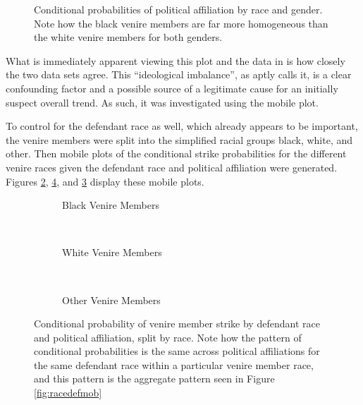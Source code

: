 \begin{figure}[h!]
  \centering
  \caption[Political Affiliation by Race and Gender (Sunshine)]
  {\footnotesize Conditional probabilities of political affiliation by race and gender. Note how the black venire members are far more
    homogeneous than the white venire members for both genders.} 
  \label{fig:racepolit}
\end{figure}

What is immediately apparent viewing this plot and the data in \cite{revesz2016} is how closely the two data sets agree. This
``ideological imbalance'', as \citeauthor{revesz2016} aptly calls it, is a clear confounding factor and a possible source of a
legitimate cause for an initially suspect overall trend. As such, it was investigated using the mobile plot.

To control for the defendant race as well, which already appears to be important, the venire members were split into the
simplified racial groups black, white, and other. Then mobile plots of the conditional strike probabilities for the different
venire races given the defendant race and political affiliation were generated. Figures \ref{fig:blackdefpol},
\ref{fig:otherdefpol}, and \ref{fig:whitedefpol} display these mobile plots.

\begin{figure}[h!]
  \centering
  \begin{subfigure}{0.40\textwidth}
    \caption{\footnotesize Black Venire Members}
    \label{fig:blackdefpol}
  \end{subfigure}
  ~
  \begin{subfigure}{0.40\textwidth}
    \caption{\footnotesize White Venire Members}
    \label{fig:whitedefpol}
  \end{subfigure}
  ~
  \begin{subfigure}{0.40\textwidth}
    \caption{\footnotesize Other Venire Members}
    \label{fig:otherdefpol}
  \end{subfigure}
  \caption[Strikes by Political Affiliation, Race, and Defendant Race (Sunshine)]
  {\footnotesize Conditional probability of venire member strike by defendant race and political affiliation, split by race. Note how the
    pattern of conditional probabilities is the same across political affiliations for the same defendant race within a particular
    venire member race, and this pattern is the aggregate pattern seen in Figure \ref{fig:racedefmob}} \label{fig:racedefpol}
\end{figure}

